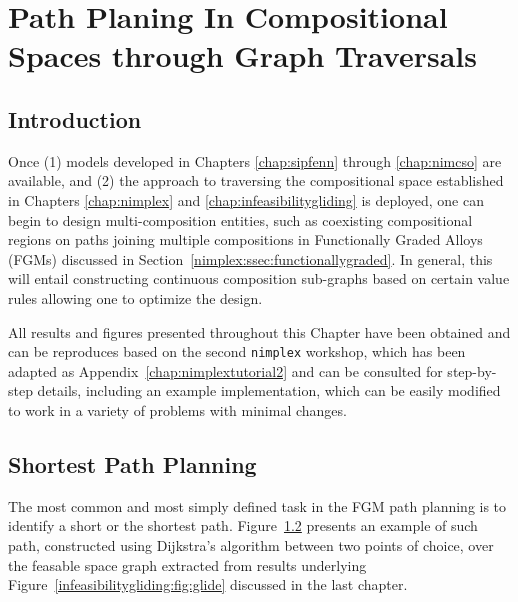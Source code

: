 \chapter{Path Planing In Compositional Spaces through Graph Traversals} \label{chap:pathplanning}


\section{Introduction} \label{pathplan:sec:intro}

Once (1) models developed in Chapters \ref{chap:sipfenn} through \ref{chap:nimcso} are available, and (2) the approach to traversing the compositional space established in Chapters \ref{chap:nimplex} and \ref{chap:infeasibilitygliding} is deployed, one can begin to design multi-composition entities, such as coexisting compositional regions on paths joining multiple compositions in Functionally Graded Alloys (FGMs) discussed in Section~\ref{nimplex:ssec:functionallygraded}. In general, this will entail constructing continuous composition sub-graphs based on certain value rules allowing one to optimize the design.

All results and figures presented throughout this Chapter have been obtained and can be reproduces based on the second \texttt{nimplex} workshop, which has been adapted as Appendix~\ref{chap:nimplextutorial2} and can be consulted for step-by-step details, including an example implementation, which can be easily modified to work in a variety of problems with minimal changes.

\section{Shortest Path Planning} \label{pathplan:sec:shortest}

The most common and most simply defined task in the FGM path planning is to identify a short \cite{Bobbio2022DesignCompositions} or the shortest path. Figure~\ref{pathplan:sec:shortest} presents an example of such path, constructed using Dijkstra's algorithm \cite{Dijkstra1959AGraphs} between two points of choice, over the feasable space graph extracted from results underlying Figure~\ref{infeasibilitygliding:fig:glide} discussed in the last chapter. 

